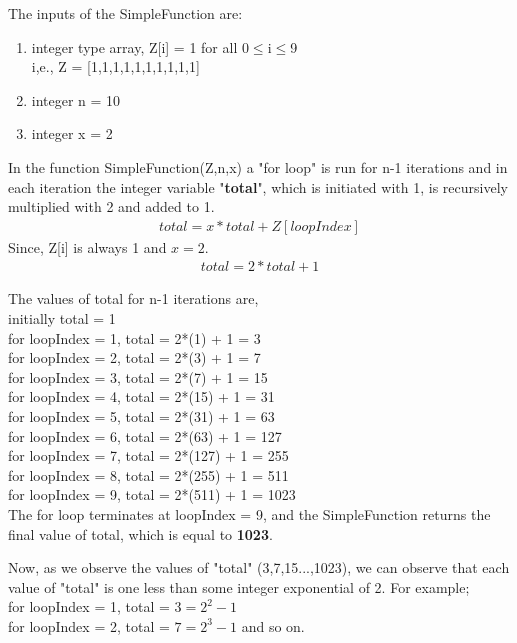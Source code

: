 \documentclass[journal,12pt,twocolumn]{IEEEtran}
\begin{document}
The inputs of the SimpleFunction are:
\begin{enumerate}
    \item integer type array, Z[i] = 1 for all 0$\le$i$\le$9 \\
    i,e., Z = [1,1,1,1,1,1,1,1,1,1] 
    \item integer n = 10
    \item integer x = 2
\end{enumerate}
\vspace{0.5cm}
In the function SimpleFunction(Z,n,x) a "for loop" is run for n-1 iterations and in each iteration the integer variable  "\textbf{total}", which is initiated with 1, is recursively multiplied with 2 and added to 1.
\begin{gather}
    total=x*total + Z[loopIndex]
\end{gather}
Since, Z[i] is always 1 and $x = 2$.
\begin{gather}
    total=2*total + 1
\end{gather}

The values of total for n-1 iterations are,\\
initially total = 1\\
for loopIndex = 1, total = 2*(1) + 1 = 3\\
for loopIndex = 2, total = 2*(3) + 1 = 7\\
for loopIndex = 3, total = 2*(7) + 1 = 15\\
for loopIndex = 4, total = 2*(15) + 1 = 31\\
for loopIndex = 5, total = 2*(31) + 1 = 63\\
for loopIndex = 6, total = 2*(63) + 1 = 127\\
for loopIndex = 7, total = 2*(127) + 1 = 255\\
for loopIndex = 8, total = 2*(255) + 1 = 511\\
for loopIndex = 9, total = 2*(511) + 1 = 1023\\

The for loop terminates at loopIndex = 9, and the SimpleFunction returns the final value of total, which is equal to \textbf{1023}.\\

\newpage

Now, as we observe the values of "total" (3,7,15...,1023), we can observe that each value of "total" is one less than some integer exponential of 2. For example; \\ 

for loopIndex = 1, total = $3 = 2^{2} - 1$ \\
for loopIndex = 2, total = $7 = 2^{3} - 1$ and so on.\\
\end{document}
